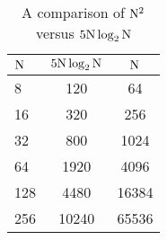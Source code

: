 \documentclass[11pt]{article}
\begin{document}
\begin{enumerate}
\begin{table}
\label{tab:nlogn}
\caption{A comparison of $\mathrm{N}^2$ versus $5\mathrm{N}\log_2\mathrm{N}$}
\centering
\begin{tabular}{l| c c }
    $\mathrm{N}$ & $5 \mathrm{N}\log_2\mathrm{N}$ & $\mathrm{N}$ \\
    \hline
    8 & 120 & 64 \\
    16 & 320 & 256\\
    32 & 800 & 1024\\
    64 & 1920 & 4096\\
    128 & 4480 & 16384\\
    256 & 10240 & 65536\\
\hline
\end{tabular}
\end{table}

\end{enumerate}
\end{document}
